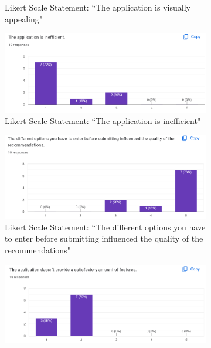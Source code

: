 \documentclass{l4proj}
\begin{document}
\begin{figure}
\begin{subfigure} [b] {0.49\textwidth}
        \caption{Likert Scale Statement: ``The application is visually appealing"}
        \label{fig:Q3}
    \end{subfigure}
    \hfill
    \begin{subfigure} [b] {0.49\textwidth}
        \centering
        \includegraphics[width=1\textwidth]{images/Q4.png}
        \caption{Likert Scale Statement: ``The application is inefficient"}
        \label{fig:Q4}
    \end{subfigure}
    \hfill
    \begin{subfigure} [b] {0.49\textwidth}
        \centering
        \includegraphics[width=1\textwidth]{images/Q5.png}
        \caption{Likert Scale Statement: ``The different options you have to enter before submitting influenced the quality of the recommendations"}
        \label{fig:Q5}
    \end{subfigure}
    \hfill
    \begin{subfigure} [b] {0.49\textwidth}
        \centering
        \includegraphics[width=1\textwidth]{images/Q6.png}

\end{subfigure}
\end{figure}
\end{document}

